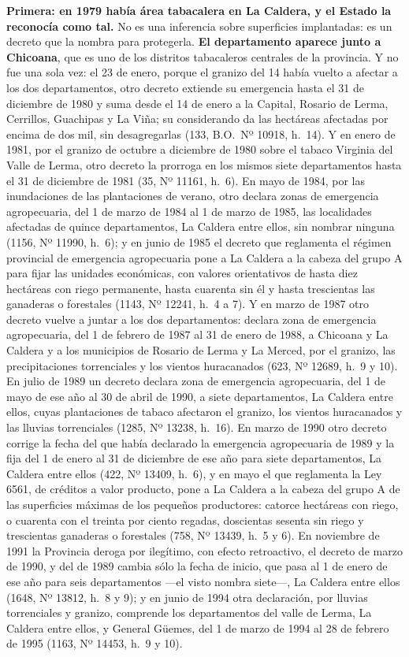 \textbf{Primera: en 1979 había área tabacalera en La Caldera, y el Estado la reconocía como
tal.} No es una inferencia sobre superficies implantadas: es un decreto que la nombra para
protegerla. \textbf{El departamento aparece junto a Chicoana}, que es uno de los distritos
tabacaleros centrales de la provincia. Y no fue una sola vez: el 23 de enero, porque el granizo del 14 había vuelto a afectar a los dos departamentos, otro decreto extiende su emergencia hasta el 31 de diciembre de 1980 y suma desde el 14 de enero a la Capital, Rosario de Lerma, Cerrillos, Guachipas y La Viña; su considerando da las hectáreas afectadas por encima de dos mil, sin desagregarlas (133, B.O.\ Nº 10918, h.\ 14). Y en enero de 1981, por el granizo de octubre a diciembre de 1980 sobre el tabaco Virginia del Valle de Lerma, otro decreto la prorroga en los mismos siete departamentos hasta el 31 de diciembre de 1981 (35, Nº 11161, h.\ 6). En mayo de 1984, por las inundaciones de las plantaciones de verano, otro declara zonas de emergencia agropecuaria, del 1 de marzo de 1984 al 1 de marzo de 1985, las localidades afectadas de quince departamentos, La Caldera entre ellos, sin nombrar ninguna (1156, Nº 11990, h.\ 6); y en junio de 1985 el decreto que reglamenta el régimen provincial de emergencia agropecuaria pone a La Caldera a la cabeza del grupo A para fijar las unidades económicas, con valores orientativos de hasta diez hectáreas con riego permanente, hasta cuarenta sin él y hasta trescientas las ganaderas o forestales (1143, Nº 12241, h.\ 4 a 7). Y en marzo de 1987 otro decreto vuelve a juntar a los dos departamentos: declara zona de emergencia agropecuaria, del 1 de febrero de 1987 al 31 de enero de 1988, a Chicoana y La Caldera y a los municipios de Rosario de Lerma y La Merced, por el granizo, las precipitaciones torrenciales y los vientos huracanados (623, Nº 12689, h.\ 9 y 10). En julio de 1989 un decreto declara zona de emergencia agropecuaria, del 1 de mayo de ese año al 30 de abril de 1990, a siete departamentos, La Caldera entre ellos, cuyas plantaciones de tabaco afectaron el granizo, los vientos huracanados y las lluvias torrenciales (1285, Nº 13238, h.\ 16). En marzo de 1990 otro decreto corrige la fecha del que había declarado la emergencia agropecuaria de 1989 y la fija del 1 de enero al 31 de diciembre de ese año para siete departamentos, La Caldera entre ellos (422, Nº 13409, h.\ 6), y en mayo el que reglamenta la Ley 6561, de créditos a valor producto, pone a La Caldera a la cabeza del grupo A de las superficies máximas de los pequeños productores: catorce hectáreas con riego, o cuarenta con el treinta por ciento regadas, doscientas sesenta sin riego y trescientas ganaderas o forestales (758, Nº 13439, h.\ 5 y 6). En noviembre de 1991 la Provincia deroga por ilegítimo, con efecto retroactivo, el decreto de marzo de 1990, y del de 1989 cambia sólo la fecha de inicio, que pasa al 1 de enero de ese año para seis departamentos ---el visto nombra siete---, La Caldera entre ellos (1648, Nº 13812, h.\ 8 y 9); y en junio de 1994 otra declaración, por lluvias torrenciales y granizo, comprende los departamentos del valle de Lerma, La Caldera entre ellos, y General Güemes, del 1 de marzo de 1994 al 28 de febrero de 1995 (1163, Nº 14453, h.\ 9 y 10).

